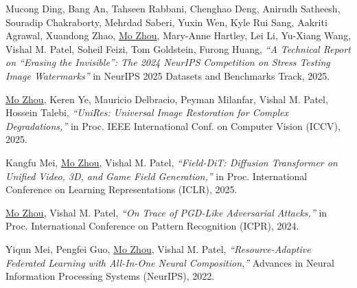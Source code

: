 \documentclass[10pt,margin,line,pifont,palatino,courier]{res}
\makeatletter
\newcommand*{\twodigits}[1]{\two@digits{\value{#1}}}
\makeatother
\begin{document}
\begin{resume}
\begin{enumerate}[noitemsep, leftmargin=*, label={[C\twodigits*]}, ref={[C\twodigits*]}]
\item Mucong Ding, Bang An, Tahseen Rabbani, Chenghao Deng, Anirudh Satheesh,
\reversemarginpar{}
        Souradip Chakraborty, Mehrdad Saberi, Yuxin Wen, Kyle Rui Sang,
        Aakriti Agrawal, Xuandong Zhao, \underline{Mo Zhou}, Mary-Anne Hartley,
        Lei Li, Yu-Xiang Wang, Vishal M. Patel, Soheil Feizi, Tom Goldstein,
        Furong Huang,
\textit{``A Technical Report on ``Erasing the Invisible'': The 2024 NeurIPS Competition on Stress Testing Image Watermarks''}
in NeurIPS 2025 Datasets and Benchmarks Track, 2025.

\item \label{pub:unires}\underline{Mo Zhou}, Keren Ye, Mauricio Delbracio, Peyman Milanfar,
\reversemarginpar{}
Vishal M. Patel, Hossein Talebi,
\textit{``UniRes: Universal Image Restoration for Complex Degradations,''}
in Proc. IEEE International Conf. on Computer Vision (ICCV), 2025. 

\item Kangfu Mei, \underline{Mo Zhou}, Vishal M. Patel,
\reversemarginpar{}
\textit{``Field-DiT: Diffusion Transformer on Unified Video, 3D, and Game Field Generation,''}
in Proc. International Conference on Learning Representations (ICLR), 2025.

\item \label{pub:advtrace}\underline{Mo Zhou}, Vishal M. Patel,
\reversemarginpar{}
\textit{``On Trace of PGD-Like Adversarial Attacks,''}
in Proc. International Conference on Pattern Recognition (ICPR), 2024.

\item Yiqun Mei, Pengfei Guo, \underline{Mo Zhou}, Vishal M. Patel,
\reversemarginpar{}
\textit{``Resource-Adaptive Federated Learning with All-In-One Neural Composition,''}
Advances in Neural Information Processing Systems (NeurIPS), 2022.


\end{enumerate}
\end{resume}
\end{document}

